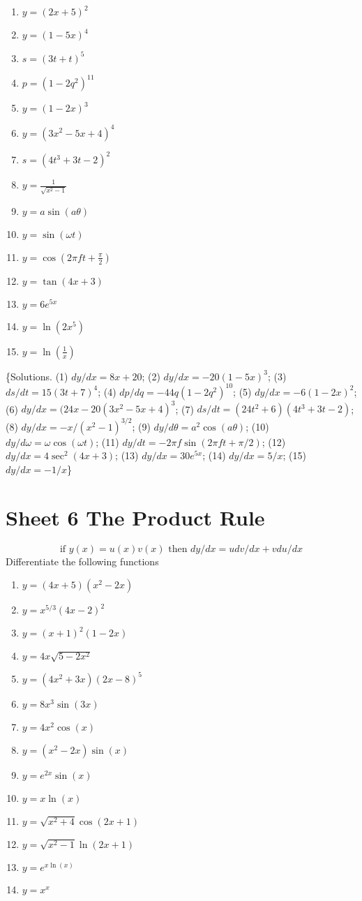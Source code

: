 \documentclass[
  11pt,
  oneside]{book}
\providecommand{\tightlist}{%
  \setlength{\itemsep}{0pt}\setlength{\parskip}{0pt}}
\newcommand{\slide}{}
\theoremstyle{definition}
\theoremstyle{definition}
\theoremstyle{definition}
\theoremstyle{definition}
\theoremstyle{remark}
\begin{document}
\begin{enumerate}
\def\labelenumi{\arabic{enumi}.}
\tightlist
\item
  \(y=(2x+5)^2\)
\item
  \(y=(1-5x)^4\)
\item
  \(s=(3t+t)^5\)
\item
  \(p=(1-2q^2)^{11}\)
\item
  \(y=(1-2x)^3\)
\item
  \(y=(3x^2-5x+4)^4\)
\item
  \(s=(4t^3+3t-2)^2\)
\item
  \(y=\frac1{\sqrt{x^2-1}}\)
\item
  \(y=a\sin(a\theta)\)
\item
  \(y=\sin(\omega t)\)
\item
  \(y=\cos(2\pi ft+\frac{\pi}2)\)
\item
  \(y=\tan(4x+3)\)
\item
  \(y=6e^{5x}\)
\item
  \(y=\ln(2x^5)\)
\item
  \(y=\ln(\frac 1x)\)
\end{enumerate}

\slide

\{Solutions. (1) \(dy/dx=8x+20\); (2) \(dy/dx=-20(1-5x)^3\); (3) \(ds/dt=15(3t+7)^4\); (4) \(dp/dq=-44q(1-2q^2)^{10}\); (5) \(dy/dx=-6(1-2x)^2\); (6) \(dy/dx=(24x-20(3x^2-5x+4)^3\); (7) \(ds/dt=(24t^2+6)(4t^3+3t-2)\); (8) \(dy/dx=-x/(x^2-1)^{3/2}\); (9) \(dy/d\theta=a^2\cos(a\theta)\); (10) \(dy/d\omega=\omega\cos(\omega t)\); (11) \(dy/dt=-2\pi f\sin(2\pi ft+\pi/2)\); (12) \(dy/dx=4\sec^2(4x+3)\); (13) \(dy/dx=30e^{5x}\); (14) \(dy/dx=5/x\); (15) \(dy/dx=-1/x\)\}
\slide

\section{Sheet 6 The Product Rule}\label{sheet-6-the-product-rule}

\[
\text{if }y(x)=u(x)v(x)\text{ then }dy/dx=udv/dx+vdu/dx
\]
Differentiate the following functions

\begin{enumerate}
\def\labelenumi{\arabic{enumi}.}
\tightlist
\item
  \(y=(4x+5)(x^2-2x)\)
\item
  \(y=x^{5/3}(4x-2)^2\)
\item
  \(y=(x+1)^2(1-2x)\)
\item
  \(y=4x\sqrt{5-2x^2}\)
\item
  \(y=(4x^2+3x)(2x-8)^5\)
\item
  \(y=8x^3\sin(3x)\)
\item
  \(y=4x^2\cos(x)\)
\item
  \(y=(x^2-2x)\sin(x)\)
\item
  \(y=e^{2x}\sin(x)\)
\item
  \(y=x\ln(x)\)
\item
  \(y=\sqrt{x^2+4}\cos(2x+1)\)
\item
  \(y=\sqrt{x^2-1}\ln(2x+1)\)
\item
  \(y=e^{x\ln(x)}\)
\item
  \(y=x^x\)
\end{enumerate}
\end{document}
